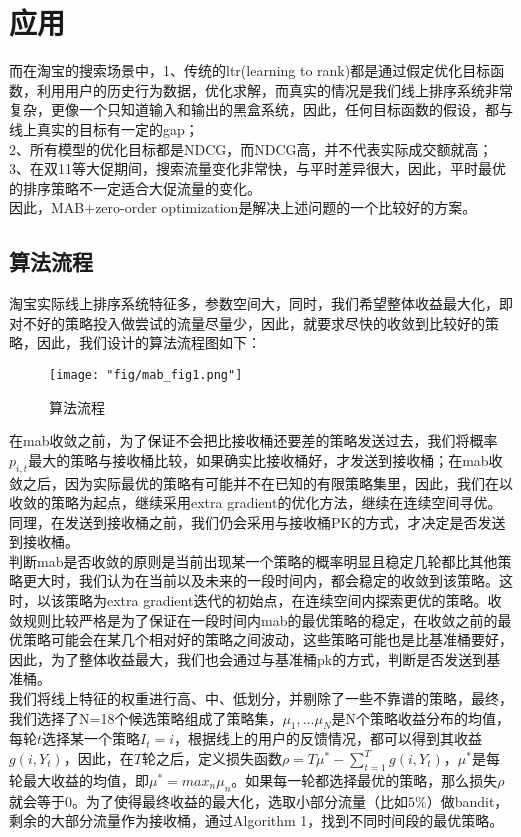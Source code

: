\section{应用}
而在淘宝的搜索场景中，1、传统的ltr(learning to rank)都是通过假定优化目标函数，利用用户的历史行为数据，优化求解，而真实的情况是我们线上排序系统非常复杂，更像一个只知道输入和输出的黑盒系统，因此，任何目标函数的假设，都与线上真实的目标有一定的gap；\\
2、所有模型的优化目标都是NDCG，而NDCG高，并不代表实际成交额就高； \\
3、在双11等大促期间，搜索流量变化非常快，与平时差异很大，因此，平时最优的排序策略不一定适合大促流量的变化。\\
因此，MAB+zero-order optimization是解决上述问题的一个比较好的方案。

\subsection{算法流程}
淘宝实际线上排序系统特征多，参数空间大，同时，我们希望整体收益最大化，即对不好的策略投入做尝试的流量尽量少，因此，就要求尽快的收敛到比较好的策略，因此，我们设计的算法流程图如下：
\begin{figure}[h]
\centering
\texttt{[image: "fig/mab\_fig1.png"]}
\caption{算法流程}
\label{fig:mab}
\end{figure}

在mab收敛之前，为了保证不会把比接收桶还要差的策略发送过去，我们将概率$p_{i,t}$最大的策略与接收桶比较，如果确实比接收桶好，才发送到接收桶；在mab收敛之后，因为实际最优的策略有可能并不在已知的有限策略集里，因此，我们在以收敛的策略为起点，继续采用extra gradient的优化方法，继续在连续空间寻优。同理，在发送到接收桶之前，我们仍会采用与接收桶PK的方式，才决定是否发送到接收桶。\\
判断mab是否收敛的原则是当前出现某一个策略的概率明显且稳定几轮都比其他策略更大时，我们认为在当前以及未来的一段时间内，都会稳定的收敛到该策略。这时，以该策略为extra gradient迭代的初始点，在连续空间内探索更优的策略。收敛规则比较严格是为了保证在一段时间内mab的最优策略的稳定，在收敛之前的最优策略可能会在某几个相对好的策略之间波动，这些策略可能也是比基准桶要好，因此，为了整体收益最大，我们也会通过与基准桶pk的方式，判断是否发送到基准桶。\\
我们将线上特征的权重进行高、中、低划分，并剔除了一些不靠谱的策略，最终，我们选择了N=18个候选策略组成了策略集，$\mu_1,...\mu_N$是N个策略收益分布的均值，每轮$t$选择某一个策略$I_t=i$，根据线上的用户的反馈情况，都可以得到其收益$g(i, Y_t)$，因此，在$T$轮之后，定义损失函数$\rho = T\mu^*-\sum_{t=1}^{T}g(i, Y_t)$，$\mu^*$是每轮最大收益的均值，即$\mu^*=max_{n}{\mu_n}$。如果每一轮都选择最优的策略，那么损失$\rho$就会等于0。为了使得最终收益的最大化，选取小部分流量（比如$5\%$）做bandit，剩余的大部分流量作为接收桶，通过Algorithm 1，找到不同时间段的最优策略。
